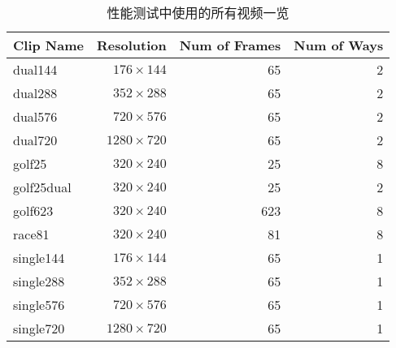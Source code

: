 \begin{table}[htbp]
  \centering
  \begin{minipage}[t]{\linewidth}
  \caption{性能测试中使用的所有视频一览}
  \label{tab:testclips}
  \centering
    \begin{tabular}{lrrr}
    \addlinespace
    \toprule[1.5pt]
    \textbf{Clip Name} & \textbf{Resolution} & \textbf{Num of Frames} & \textbf{Num of Ways} \\
    \midrule[1pt]
    dual144		& $176\times 144$	& 65	& 2 \\
    dual288		& $352\times 288$	& 65	& 2 \\
    dual576		& $720\times 576$	& 65	& 2 \\
    dual720		& $1280\times 720$	& 65	& 2 \\
    golf25		& $320\times 240$	& 25	& 8 \\
    golf25dual	& $320\times 240$	& 25	& 2 \\
    golf623		& $320\times 240$	& 623	& 8 \\
    race81		& $320\times 240$	& 81	& 8 \\
    single144	& $176\times 144$	& 65	& 1 \\
    single288	& $352\times 288$	& 65	& 1 \\
    single576	& $720\times 576$	& 65	& 1 \\
    single720	& $1280\times 720$	& 65	& 1 \\
    \bottomrule[1.5pt]
    \end{tabular}
  \end{minipage}
\end{table}